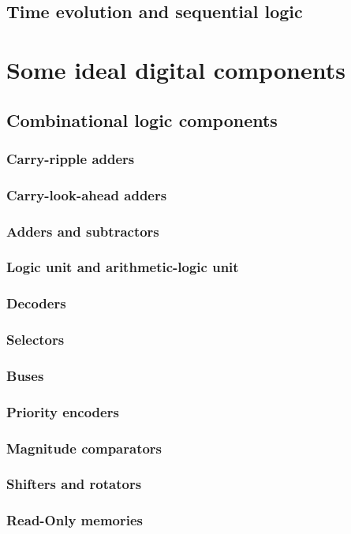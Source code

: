 \documentclass{report}
\begin{document}
\section{Time evolution and sequential logic}
\chapter{Some ideal digital components}
\section{Combinational logic components}
\subsection{Carry-ripple adders}
\subsection{Carry-look-ahead adders}
\subsection{Adders and subtractors}
\subsection{Logic unit and arithmetic-logic unit}
\subsection{Decoders}
\subsection{Selectors}
\subsection{Buses}
\subsection{Priority encoders}
\subsection{Magnitude comparators}
\subsection{Shifters and rotators}
\subsection{Read-Only memories}
\end{document}
